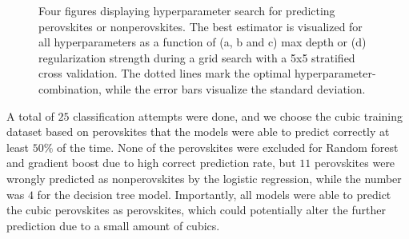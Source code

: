 \begin{figure}[!ht]
  \begin{subfigure}[b]{1.0\textwidth}
    \centering
    
  \end{subfigure}
  \par\bigskip
  \begin{subfigure}[b]{0.5\textwidth}
    
    \caption{}
    \label{fig:per-LOG}
  \end{subfigure}%
  \hfill
  \begin{subfigure}[b]{0.5\textwidth}
    
    \caption{}
    \label{fig:per-DT}
  \end{subfigure}

  \begin{subfigure}[b]{0.5\textwidth}
    
    \caption{}
    \label{fig:per-RF}
  \end{subfigure}%
  \hfill
  \begin{subfigure}[b]{0.5\textwidth}
    
    \caption{}
    \label{fig:per-GB}
  \end{subfigure}
  \vspace*{-130mm}
  \caption{{Four figures displaying hyperparameter search for predicting perovskites or nonperovskites. The best estimator is visualized for all hyperparameters as a function of (a, b and c) max depth or (d) regularization strength during a grid search with a 5x5 stratified cross validation. The dotted lines mark the optimal hyperparameter-combination, while the error bars visualize the standard deviation. }}
  \label{fig:perovskite-params}
\end{figure}

A total of $25$ classification attempts were done, and we choose the cubic training dataset based on perovskites that the models were able to predict correctly at least $50\%$ of the time. None of the perovskites were excluded for Random forest and gradient boost due to high correct prediction rate, but $11$ perovskites were wrongly predicted as nonperovskites by the logistic regression, while the number was $4$ for the decision tree model. Importantly, all models were able to predict the cubic perovskites as perovskites, which could potentially alter the further prediction due to a small amount of cubics.

